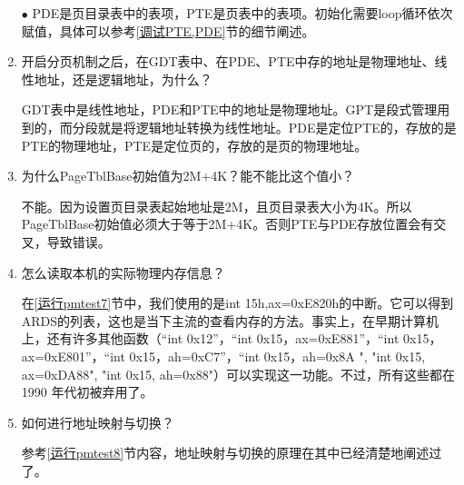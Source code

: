 \documentclass[UTF8,12pt]{ctexart}
\begin{document}
\begin{enumerate}
    $\bullet$ PDE是页目录表中的表项，PTE是页表中的表项。初始化需要loop循环依次赋值，具体可以参考\ref{调试PTE,PDE}节的细节阐述。
    
    \item 开启分页机制之后，在GDT表中、在PDE、PTE中存的地址是物理地址、线性地址，还是逻辑地址，为什么？

    GDT表中是线性地址，PDE和PTE中的地址是物理地址。GPT是段式管理用到的，而分段就是将逻辑地址转换为线性地址。PDE是定位PTE的，存放的是PTE的物理地址，PTE是定位页的，存放的是页的物理地址。
    
    \item 为什么PageTblBase初始值为2M+4K？能不能比这个值小？
    
    不能。因为设置页目录表起始地址是2M，且页目录表大小为4K。所以PageTblBase初始值必须大于等于2M+4K。否则PTE与PDE存放位置会有交叉，导致错误。
    
    \item 怎么读取本机的实际物理内存信息？
    
    在\ref{运行pmtest7}节中，我们使用的是int 15h,ax=0xE820h的中断。它可以得到ARDS的列表，这也是当下主流的查看内存的方法。事实上，在早期计算机上，还有许多其他函数（“int 0x12”，“int 0x15，ax=0xE881”，“int 0x15，ax=0xE801”，“int 0x15，ah=0xC7”，“int 0x15，ah=0x8A ", "int 0x15, ax=0xDA88", "int 0x15, ah=0x88"）可以实现这一功能。不过，所有这些都在1990 年代初被弃用了。
    
    \item 如何进行地址映射与切换？
    
    参考\ref{运行pmtest8}节内容，地址映射与切换的原理在其中已经清楚地阐述过了。
    
    \end{enumerate}
    
    
\end{document}
